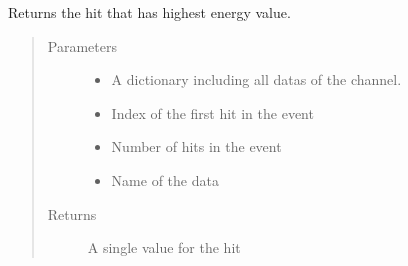 \documentclass[letterpaper,10pt,english]{sphinxmanual}
\begin{document}
\begin{fulllineitems}
\label{\detokenize{autodocs/data:listmode.data.max_e_combinator}}
\sphinxAtStartPar
Returns the hit that has highest energy value.
\begin{quote}\begin{description}
\item[{Parameters}] \leavevmode\begin{itemize}
\item {} 
\sphinxAtStartPar
{} \textendash{} A dictionary including all datas of the channel.

\item {} 
\sphinxAtStartPar
{} \textendash{} Index of the first hit in the event

\item {} 
\sphinxAtStartPar
{} \textendash{} Number of hits in the event

\item {} 
\sphinxAtStartPar
{} \textendash{} Name of the data

\end{itemize}

\item[{Returns}] \leavevmode
\sphinxAtStartPar
A single value for the hit

\end{description}\end{quote}

\end{fulllineitems}

\end{document}
